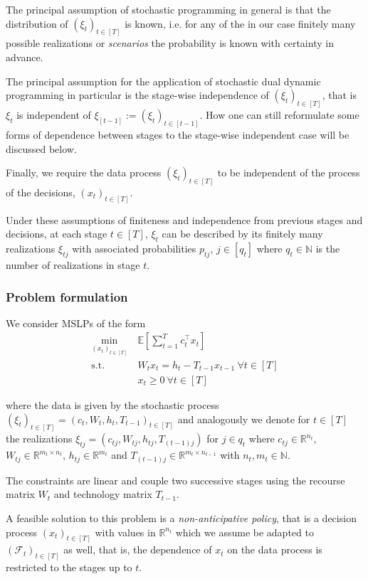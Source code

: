 \documentclass[a4paper,12pt]{article}
\newcommand{\R}{\mathbb R} %
\newcommand{\E}{\mathbb{E}}
\begin{document}
The principal assumption of stochastic programming in general is that the distribution of $(\xi_t)_{t\in [T]}$ is known, i.e. for any of the in our case finitely many possible realizations or \emph{scenarios} the probability is known with certainty in advance.

The principal assumption for the application of stochastic dual dynamic programming in particular is the stage-wise independence of $(\xi_t)_{t\in [T]}$, that is $\xi_t$ is independent of $\xi_{[t-1]} := (\xi_t)_{t\in [t-1]}$. How one can still reformulate some forms of dependence between stages to the stage-wise independent case will be discussed below.

Finally, we require the data process $(\xi_t)_{t\in [T]}$ to be independent of the process of the decisions, $(x_t)_{t\in [T]}$.

Under these assumptions of finiteness and independence from previous stages and decisions, at each stage $t\in [T]$, $\xi_t$ can be described by its finitely many realizations $\xi_{tj}$ with associated probabilities $p_{tj}$, $j\in [q_t]$ where $q_t\in \mathbb{N}$ is the number of realizations in stage $t$.

\subsubsection{Problem formulation}

We consider MSLPs of the form
\begin{align*}
    \min_{(x_t)_{t\in [T]}} \ & \E\left[ \sum_{t=1}^T c_t^\top x_t \right] \\
    \text{s.t. } & W_t x_t = h_t - T_{t-1} x_{t-1} \ \forall t \in [T] \\
    & x_t \geq 0 \ \forall t \in [T]
\end{align*}

where the data is given by the stochastic process $(\xi_t)_{t\in [T]} = (c_t, W_t, h_t, T_{t-1})_{t\in [T]}$ and analogously we denote for $t\in [T]$ the realizations $\xi_{tj} = (c_{tj}, W_{tj}, h_{tj}, T_{(t-1)j})$ for $j\in q_t$ where $c_{tj} \in \R^{n_t}$, $W_{tj} \in \R^{m_t \times n_t}$, $h_{tj} \in \R^{m_t}$ and $T_{(t-1)j} \in \R^{m_t \times n_{t-1}}$ with $n_t, m_t \in \mathbb{N}$.

The constraints are linear and couple two successive stages using the recourse matrix $W_t$ and technology matrix $T_{t-1}$.

A feasible solution to this problem is a \emph{non-anticipative policy}, that is a decision process $(x_t)_{t\in [T]}$ with values in $\R^{n_t}$ which we assume be adapted to $(\mathcal{F}_t)_{t\in [T]}$ as well, that is, the dependence of $x_t$ on the data process is restricted to the stages up to $t$.
\end{document}
